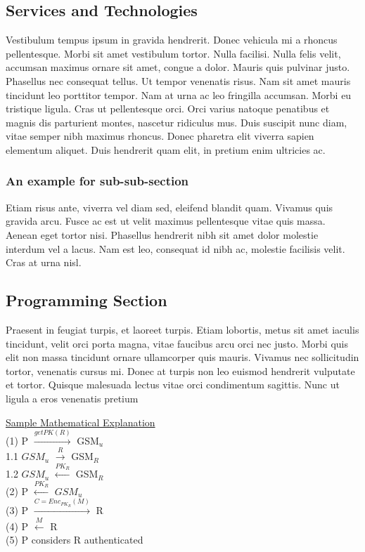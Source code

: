 \subsection{Services and Technologies}
Vestibulum tempus ipsum in gravida hendrerit. Donec vehicula mi a rhoncus pellentesque. Morbi sit amet vestibulum tortor. Nulla facilisi. Nulla felis velit, accumsan maximus ornare sit amet, congue a dolor. Mauris quis pulvinar justo. Phasellus nec consequat tellus. Ut tempor venenatis risus. Nam sit amet mauris tincidunt leo porttitor tempor. Nam at urna ac leo fringilla accumsan. Morbi eu tristique ligula. Cras ut pellentesque orci. Orci varius natoque penatibus et magnis dis parturient montes, nascetur ridiculus mus. Duis suscipit nunc diam, vitae semper nibh maximus rhoncus. Donec pharetra elit viverra sapien elementum aliquet. Duis hendrerit quam elit, in pretium enim ultricies ac.

\subsubsection{An example for sub-sub-section}
Etiam risus ante, viverra vel diam sed, eleifend blandit quam. Vivamus quis gravida arcu. Fusce ac est ut velit maximus pellentesque vitae quis massa. Aenean eget tortor nisi. Phasellus hendrerit nibh sit amet dolor molestie interdum vel a lacus. Nam est leo, consequat id nibh ac, molestie facilisis velit. Cras at urna nisl.

\subsection{Programming Section}

Praesent in feugiat turpis, et laoreet turpis. Etiam lobortis, metus sit amet iaculis tincidunt, velit orci porta magna, vitae faucibus arcu orci nec justo. Morbi quis elit non massa tincidunt ornare ullamcorper quis mauris. Vivamus nec sollicitudin tortor, venenatis cursus mi. Donec at turpis non leo euismod hendrerit vulputate et tortor. Quisque malesuada lectus vitae orci condimentum sagittis. Nunc ut ligula a eros venenatis pretium

\begin{center}
  \begin{parbox}[t]{.45\linewidth}
    {\textsf{\underline{Sample Mathematical Explanation} \\
      (1) P $\xrightarrow{getPK(R)}$ GSM$_u$ \\
      1.1 $GSM_u$ $\xrightarrow{R}$ GSM$_R$\\
      1.2 $GSM_u$ $\xleftarrow{PK_R}$ GSM$_R$\\
      (2) P $\xleftarrow{PK_R}$ $GSM_u$ \\
      (3) P $\xrightarrow{C=Enc_{PK_R}(M)}$ R \\
      (4) P $\xleftarrow{M}$ R \\
      (5) P considers R authenticated \\
      \hfill
    }} \\
  \end{parbox}
\end{center}
